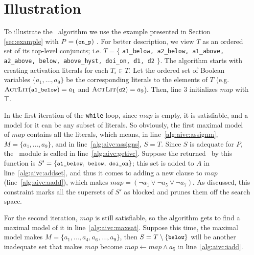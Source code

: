 \section{Illustration}
\label{sec:illust}
To illustrate the \aivcalg ~algorithm we use the example presented in Section \ref{sec:example} with $P = ({\small \texttt{on\_p}})$ .
For better description, we view $T$ as an ordered set of its top-level conjuncts; i.e. $T = \{$ {\small \texttt{a1\_below, a2\_below, a1\_above, a2\_above, below, above\_hyst, doi\_on, d1, d2}} $\}$.
The algorithm starts with creating activation literals for each $T_i \in T$. Let the ordered set of Boolean variables $\{ a_1, \ldots , a_9 \}$ be the corresponding literals to the elements of $T$ (e.g. $\textsc{ActLit} ({ \small \texttt{a1\_below}}) = a_1$ and $\textsc{ActLit} ({\small \texttt{d2}}) = a_9$). Then, line 3 initializes $map$ with $\top$.

In the first iteration of the \texttt{while} loop, since $map$ is
empty, it is satisfiable, and a model for it can be any subset of
literals. So obviously, the first maximal model of $map$ contains all
the literals, which means, in line~\ref{alg:aivc:assignm}, $M = \{a_1,
\ldots, a_9\}$, and in line~\ref{alg:aivc:assigns}, $S = T$. Since $S$
is adequate for $P$, the \getivc ~module is called in
line~\ref{alg:aivc:getivc}. Suppose the returned \mivc\ by this function
is $S' = \{ { \small \texttt{a1\_below},~\texttt{below},
  ~\texttt{doi\_on}}\}$; this set is added to $A$ in
line~\ref{alg:aivc:addset}, and thus it comes to adding a new clause
to $map$ (line~\ref{alg:aivc:aadd}), which makes $map = (\neg a_1 \vee
\neg a_5 \vee \neg a_7)$. As discussed, this constraint
marks all the supersets of $S'$ as blocked and prunes them off the
search space.

For the second iteration, $map$ is still satisfiable,
so the algorithm gets to find a maximal model of it in line~\ref{alg:aivc:maxsat}. Suppose this time, the maximal model makes $M = \{a_1, \ldots, a_4, a_6, \ldots, a_9\}$, then $S = T \setminus \{ {\small \texttt{below}}\} $ will be another inadequate set that makes $map$ become
$map \leftarrow map \wedge a_5$
in line~\ref{alg:aivc:iadd}.

